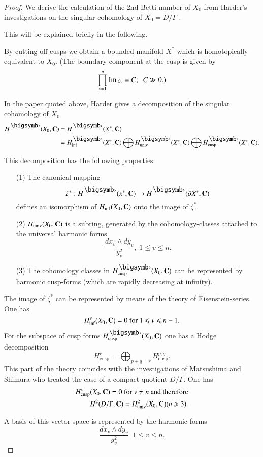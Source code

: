 \begin{proof}
We derive the calculation of the 2nd Betti number of $X_0$ from Harder's investigations on the singular cohomology of $X_0 = D/\Gamma$ \cite{art2-key2}.

This will be explained briefly in the following.

By cutting off cusps we obtain a bounded manifold $X^\ast$ which is homotopically equivalent to $X_0$. (The boundary component at the cusp is given by
$$
\prod^n_{v=1} \operatorname{Im} z_v = C; \; \; C \gg 0.)
$$

In the paper quoted above, Harder gives a decomposition of the singular cohomology of $X_0$
\begin{align*}
H^\bigdot (X_0, \bC) & = H^\bigdot (X^\ast, \bC)\\
& = H^\bigdot_{\inf} (X^\ast, \bC) \bigoplus H^\bigdot_{\text{univ}} (X^\ast, \bC) \bigoplus H^\bigdot_{\text{cusp}} (X^\ast,\bC).
\end{align*}

This decomposition has the following properties:
\begin{enumerate}
\item[(1)] The canonical mapping 
$$
\zeta^\ast: H^\bigdot (x^\ast, \bC) \to H^\bigdot (\partial X^\ast, \bC)
$$
defines an isomorphism of $H_{\inf} (X_0, \mathbf{C})$ onto the image of $\zeta^\ast$.

\item[(2)] $H_{\text{univ}} (X_0, \mathbf{C})$ is a subring, generated by the cohomology-classes attached to the universal harmonic forms 
$$
\frac{dx_v\wedge dy_v}{y^2_v}, \; 1 \leqslant v \leqslant n.
$$

 \item[(3)] The cohomology classes in $H^\bigdot_{\text{cusp}} (X_0, \bC)$ can be represented by harmonic cusp-forms (which are rapidly decreasing at infinity).
\end{enumerate}

The image of $\zeta^\ast$ can be represented by means of the theory of Eisenstein-series. One has
$$
H^v_{\inf} (X_0, \mathbf{C}) = 0 \text{ for } 1 \leqslant v \leqslant n -1.
$$\pageoriginale
For the subspace of cusp forms $H^\bigdot_{\text{cusp}} (X_0, \bC)$ one has a Hodge decomposition
$$
H^r_{\text{cusp}} = \bigoplus_{p+q=r} H^{p,q}_{\text{cusp}}.
$$
This part of the theory coincides with the investigations of Matsushima and Shimura \cite{art2-key3} who treated the case of a compact quotient $D/\Gamma$. One has 
\begin{align*}
H^v_{\text{cusp}} (X_0, \mathbf{C}) = 0 \text{ for } v \neq n \text{ and therefore}\\
H^2 (D/\Gamma, \mathbf{C}) = H^2_{\text{univ}} (X_0,\mathbf{C}) (n \geqslant 3).
\end{align*}

A basis of this vector space is represented by the harmonic forms
$$
\frac{dx_v \wedge dy_v}{y^2_v} \;\; 1 \leqslant v \leqslant n.
$$
\end{proof}

